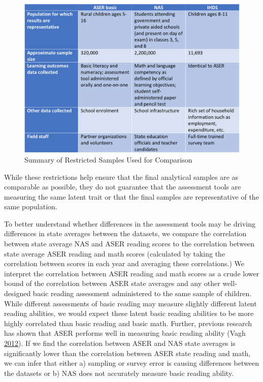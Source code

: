 \documentclass[
  11pt,
]{article}
\begin{document}
\begin{figure}

{\centering \includegraphics[width=0.8\linewidth]{summary_learning_outcomes} 

}

\caption{Summary of Restricted Samples Used for Comparison}\label{fig:restrictedsample}
\end{figure}

While these restrictions help ensure that the final analytical samples are as comparable as possible, they do not guarantee that the assessment tools are measuring the same latent trait or that the final samples are representative of the same population.

To better understand whether differences in the assessment tools may be driving differences in state averages between the datasets, we compare the correlation between state average NAS and ASER reading scores to the correlation between state average ASER reading and math scores (calculated by taking the correlation between scores in each year and averaging these correlations.) We interpret the correlation between ASER reading and math scores as a crude lower bound of the correlation between ASER state averages and any other well-designed basic reading assessment administered to the same sample of children. While different assessments of basic reading may measure slightly different latent reading abilities, we would expect these latent basic reading abilities to be more highly correlated than basic reading and basic math. Further, previous research has shown that ASER performs well in measuring basic reading ability (Vagh \protect\hyperlink{ref-vagh2012validating}{2012}). If we find the correlation between ASER and NAS state averages is significantly lower than the correlation between ASER state reading and math, we can infer that either a) sampling or survey error is causing differences between the datasets or b) NAS does not accurately measure basic reading ability.
\end{document}
